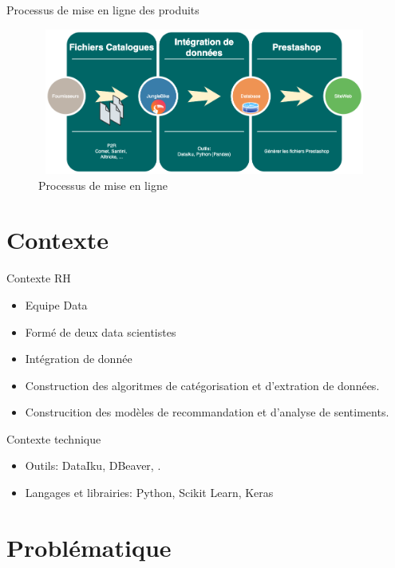 \documentclass[xelatex,12pt]{beamer}
\begin{document}
\begin{frame}{Processus de mise en ligne des produits}
\begin{figure}[H]
    \includegraphics[width=11cm,height=4.8cm]{images/integration_steps.png}
    \caption{Processus de mise en ligne}
    \label{fig:L1}
\end{figure}
\end{frame}

\section{Contexte} %

\begin{frame}{Contexte RH}
  \begin{itemize}
  \item Equipe Data 
  \item Formé de deux data scientistes
  \item Intégration de donnée
  \item Construction des algoritmes de catégorisation et d'extration de données.
  \item Construcition des modèles de recommandation et d'analyse de sentiments.
  \end{itemize}
\end{frame}

\begin{frame}{Contexte technique}
  \begin{itemize}
  \item Outils: DataIku, DBeaver, .
  \item Langages et librairies: Python, Scikit Learn, Keras
  \end{itemize}
\end{frame}

\section{Problématique}
\end{document}
